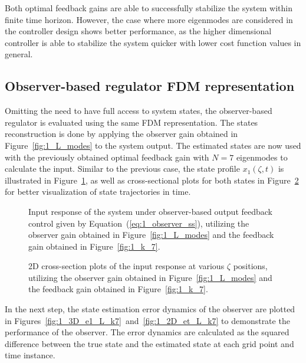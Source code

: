 Both optimal feedback gains are able to successfully stabilize the system within finite time horizon. However, the case where more eigenmodes are considered in the controller design shows better performance, as the higher dimensional controller is able to stabilize the system quicker with lower cost function values in general.

\subsection{Observer-based regulator FDM representation} \label{sec:1_observer}

Omitting the need to have full access to system states, the observer-based regulator is evaluated using the same FDM representation. The states reconstruction is done by applying the observer gain obtained in Figure~\ref{fig:1_L_modes} to the system output. The estimated states are now used with the previously obtained optimal feedback gain with $N=7$ eigenmodes to calculate the input. Similar to the previous case, the state profile $x_1(\zeta,t)$ is illustrated in Figure~\ref{fig:1_3D_x1_L_k7}, as well as cross-sectional plots for both states in Figure~\ref{fig:1_2D_xt_L_k7} for better visualization of state trajectories in time.

\begin{figure}[!htbp]
    \centering
    
    \caption{Input response of the system under observer-based output feedback control given by Equation~(\ref{eq:1_observer_ss}), utilizing the observer gain obtained in Figure~\ref{fig:1_L_modes} and the feedback gain obtained in Figure~\ref{fig:1_k_7}.}
    \label{fig:1_3D_x1_L_k7}
\end{figure}

\begin{figure}[!htbp]
    \centering
    
    \caption{2D cross-section plots of the input response at various $\zeta$ positions, utilizing the observer gain obtained in Figure~\ref{fig:1_L_modes} and the feedback gain obtained in Figure~\ref{fig:1_k_7}.}
    \label{fig:1_2D_xt_L_k7}
\end{figure}

In the next step, the state estimation error dynamics of the observer are plotted in Figures~\ref{fig:1_3D_e1_L_k7}~and~\ref{fig:1_2D_et_L_k7} to demonstrate the performance of the observer. The error dynamics are calculated as the squared difference between the true state and the estimated state at each grid point and time instance.

